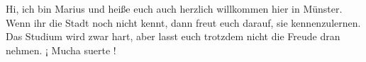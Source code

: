 \begin{multicols*}{2}
	
{Hi, ich bin Marius und heiße euch auch herzlich willkommen hier in Münster. Wenn ihr die Stadt noch nicht kennt, dann freut euch darauf, sie kennenzulernen. Das Studium wird zwar hart, aber lasst euch trotzdem nicht die Freude dran nehmen. ¡ Mucha suerte !}



\end{multicols*}
